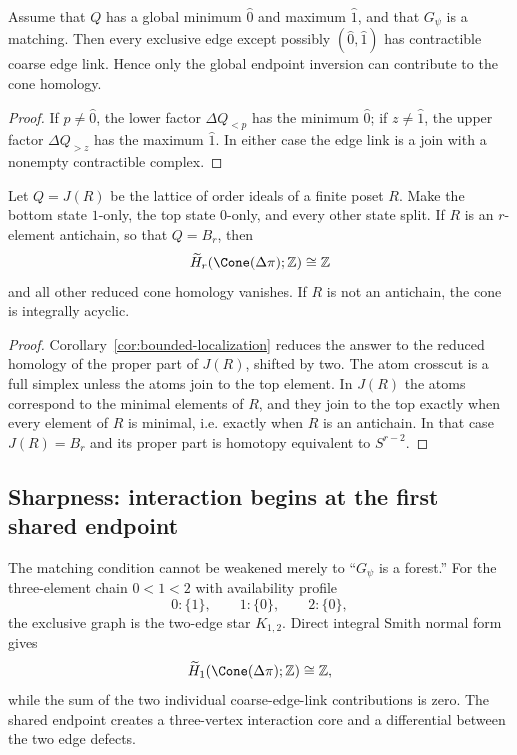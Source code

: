 \begin{corollary}
\label{cor:bounded-localization}
Assume that $Q$ has a global minimum $\hat0$ and maximum $\hat1$, and that
$G_\psi$ is a matching.  Then every exclusive edge except possibly
$(\hat0,\hat1)$ has contractible coarse edge link.  Hence only the global
endpoint inversion can contribute to the cone homology.
\end{corollary}

\begin{proof}
If $p\ne\hat0$, the lower factor $\Delta Q_{<p}$ has the minimum $\hat0$; if
$z\ne\hat1$, the upper factor $\Delta Q_{>z}$ has the maximum $\hat1$.  In
either case the edge link is a join with a nonempty contractible complex.
\end{proof}

\begin{corollary}
\label{cor:distributive-endpoint}
Let $Q=J(R)$ be the lattice of order ideals of a finite poset $R$.  Make the
bottom state $1$-only, the top state $0$-only, and every other state split.  If
$R$ is an $r$-element antichain, so that $Q=B_r$, then
\[
\widetilde H_r(\Cone(\Delta\pi);\mathbb Z)\cong\mathbb Z
\]
and all other reduced cone homology vanishes.  If $R$ is not an antichain,
the cone is integrally acyclic.
\end{corollary}

\begin{proof}
Corollary~\ref{cor:bounded-localization} reduces the answer to the reduced
homology of the proper part of $J(R)$, shifted by two.  The atom crosscut is a
full simplex unless the atoms join to the top element.  In $J(R)$ the atoms
correspond to the minimal elements of $R$, and they join to the top exactly
when every element of $R$ is minimal, i.e. exactly when $R$ is an antichain.
In that case $J(R)=B_r$ and its proper part is homotopy equivalent to
$S^{r-2}$.
\end{proof}

\subsection{Sharpness: interaction begins at the first shared endpoint}

The matching condition cannot be weakened merely to ``$G_\psi$ is a
forest.''  For the three-element chain $0<1<2$ with availability profile
\[
0:\{1\},\qquad 1:\{0\},\qquad 2:\{0\},
\]
the exclusive graph is the two-edge star $K_{1,2}$.  Direct integral Smith
normal form gives
\[
\widetilde H_1(\Cone(\Delta\pi);\mathbb Z)\cong\mathbb Z,
\]
while the sum of the two individual coarse-edge-link contributions is zero.
The shared endpoint creates a three-vertex interaction core and a differential
between the two edge defects.

